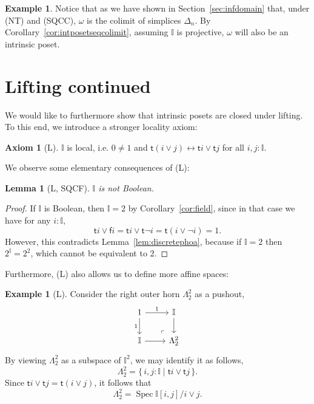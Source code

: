 \documentclass[12pt]{amsart}
\newtheorem{lemma}[theorem]{Lemma}
\theoremstyle{definition}
\newtheorem{example}[theorem]{Example}
\newtheorem{axiom}{Axiom}
\newcommand{\mbb}[1]{\mathbb{#1}}
\newcommand{\I}{\mbb I}
\newcommand{\ms}[1]{\mathsf{#1}}
\newcommand{\scomp}[2]{\{\,#1\mid#2\,\}}
\newcommand{\eq}{\leftrightarrow}
\newcommand{\spec}{\operatorname{Spec}}
\begin{document}
\begin{example}
  Notice that as we have shown in Section~\ref{sec:infdomain} that, under (NT) and (SQCC), $\omega$ is the colimit of simplices $\Delta_n$. By Corollary~\ref{cor:intposetseqcolimit}, assuming $\I$ is projective, $\omega$ will also be an intrinsic poset.
\end{example}

\section{Lifting continued}

We would like to furthermore show that intrinsic posets are closed under lifting. To this end, we introduce a stronger locality axiom:

\begin{axiom}[L]
  $\I$ is local, i.e. $0 \neq 1$ and $\ms t(i\vee j) \eq \ms ti \vee \ms tj$ for all $i,j : \I$.
\end{axiom}

We observe some elementary consequences of (L):

\begin{lemma}[L, SQCF]
  $\I$ is not Boolean.
\end{lemma}
\begin{proof}
  If $\I$ is Boolean, then $\I = 2$ by Corollary~\ref{cor:field}, since in that case we have for any $i : \I$,
  \[ \ms ti \vee \ms fi = \ms ti \vee \ms t\neg i = \ms t(i \vee \neg i) = 1. \]
  However, this contradicts Lemma~\ref{lem:discretephoa}, because if $\I = 2$ then $2^\I = 2^2$, which cannot be equivalent to $2$.
\end{proof}

Furthermore, (L) also allows us to define more affine spaces:

\begin{example}[L]
  Consider the right outer horn $\Lambda^2_2$ as a pushout,
  \[
    \begin{tikzcd}
      1 \ar[d, "1"'] \ar[r, "1"] & \I \ar[d] \\
      \I \ar[r] & \Lambda^2_2
      \arrow["\lrcorner"{anchor=center, pos=0.125, rotate=180}, draw=none, from=2-2, to=1-1]
    \end{tikzcd}
  \]
  By viewing $\Lambda^2_2$ as a subspace of $\I^2$, we may identify it as follows,
  \[ \Lambda^2_2 = \scomp{i,j : \I}{\ms ti \vee \ms tj}. \]
  Since $\ms ti \vee \ms tj = \ms t(i\vee j)$, it follows that 
  \[ \Lambda^2_2 = \spec \I[i,j]/i \vee j. \]
\end{example}
\end{document}
